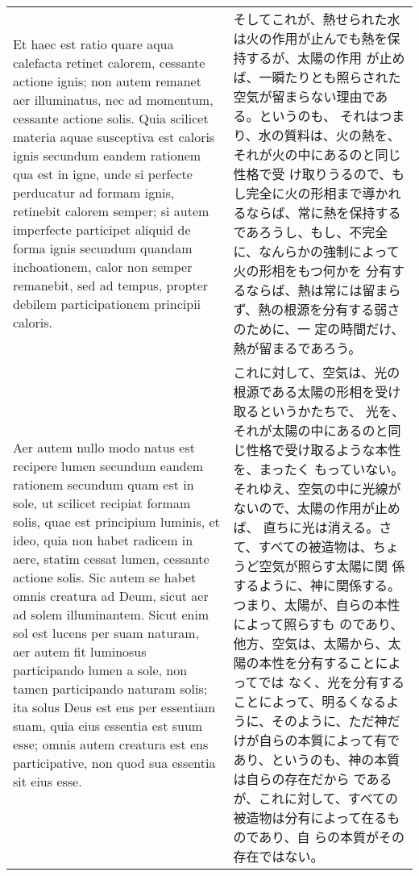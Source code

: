 \documentclass[10pt]{jsarticle} %
\begin{document}
\begin{longtable}{p{21em}p{21em}}
\\



Et haec est ratio quare aqua
calefacta retinet calorem, cessante actione ignis; non autem remanet aer
illuminatus, nec ad momentum, cessante actione solis. Quia scilicet
materia aquae susceptiva est caloris ignis secundum eandem rationem qua
est in igne, unde si perfecte perducatur ad formam ignis, retinebit
calorem semper; si autem imperfecte participet aliquid de forma ignis
secundum quandam inchoationem, calor non semper remanebit, sed ad
tempus, propter debilem participationem principii caloris. 


&


そしてこれが、熱せられた水は火の作用が止んでも熱を保持するが、太陽の作用
 が止めば、一瞬たりとも照らされた空気が留まらない理由である。というのも、
 それはつまり、水の質料は、火の熱を、それが火の中にあるのと同じ性格で受
 け取りうるので、もし完全に火の形相まで導かれるならば、常に熱を保持する
 であろうし、もし、不完全に、なんらかの強制によって火の形相をもつ何かを
 分有するならば、熱は常には留まらず、熱の根源を分有する弱さのために、一
 定の時間だけ、熱が留まるであろう。

\\



Aer autem
nullo modo natus est recipere lumen secundum eandem rationem secundum
quam est in sole, ut scilicet recipiat formam solis, quae est principium
luminis, et ideo, quia non habet radicem in aere, statim cessat lumen,
cessante actione solis. Sic autem se habet omnis creatura ad Deum, sicut
aer ad solem illuminantem. Sicut enim sol est lucens per suam naturam,
aer autem fit luminosus participando lumen a sole, non tamen
participando naturam solis; ita solus Deus est ens per essentiam suam,
quia eius essentia est suum esse; omnis autem creatura est ens
participative, non quod sua essentia sit eius esse. 


&
これに対して、空気は、光の根源である太陽の形相を受け取るというかたちで、
 光を、それが太陽の中にあるのと同じ性格で受け取るような本性を、まったく
 もっていない。それゆえ、空気の中に光線がないので、太陽の作用が止めば、
 直ちに光は消える。さて、すべての被造物は、ちょうど空気が照らす太陽に関
 係するように、神に関係する。つまり、太陽が、自らの本性によって照らすも
 のであり、他方、空気は、太陽から、太陽の本性を分有することによってでは
 なく、光を分有することによって、明るくなるように、そのように、ただ神だ
 けが自らの本質によって有であり、というのも、神の本質は自らの存在だから
 であるが、これに対して、すべての被造物は分有によって在るものであり、自
 らの本質がその存在ではない。


\end{longtable}
\end{document}
